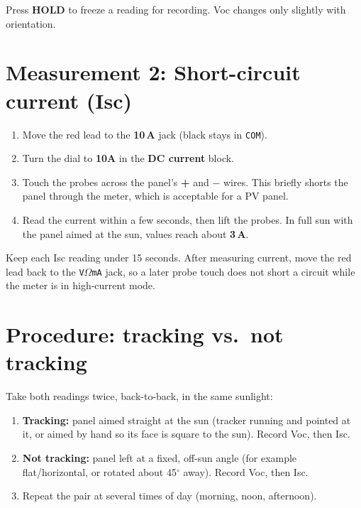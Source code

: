 \documentclass[11pt]{article}
\begin{document}
\begin{tip}
Press \textbf{HOLD} to freeze a reading for recording. Voc changes only slightly with
orientation.
\end{tip}

\section{Measurement 2: Short-circuit current (Isc)}
\begin{enumerate}
  \item Move the red lead to the \textbf{10\,A} jack (black stays in \texttt{COM}).
  \item Turn the dial to \textbf{10A} in the \textbf{DC current} block.
  \item Touch the probes across the panel's \textbf{+} and \textbf{$-$} wires. This
        briefly shorts the panel through the meter, which is acceptable for a PV panel.
  \item Read the current within a few seconds, then lift the probes. In full sun with the
        panel aimed at the sun, values reach about \textbf{3\,A}.
\end{enumerate}

\begin{warn}
Keep each Isc reading under 15 seconds. After measuring current, move the red lead back
to the \texttt{V$\Omega$mA} jack, so a later probe touch does not short a circuit while
the meter is in high-current mode.
\end{warn}

\section{Procedure: tracking vs.\ not tracking}
Take both readings twice, back-to-back, in the same sunlight:

\begin{enumerate}
  \item \textbf{Tracking:} panel aimed straight at the sun (tracker running and pointed at
        it, or aimed by hand so its face is square to the sun). Record Voc, then Isc.
  \item \textbf{Not tracking:} panel left at a fixed, off-sun angle (for example
        flat/horizontal, or rotated about 45$^\circ$ away). Record Voc, then Isc.
  \item Repeat the pair at several times of day (morning, noon, afternoon).
\end{enumerate}
\end{document}
